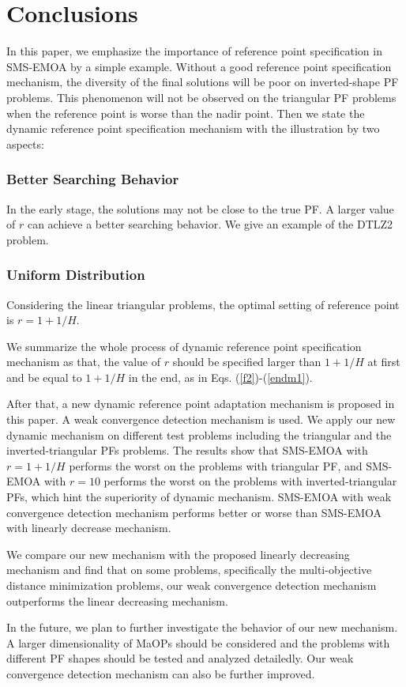 \documentclass[conference]{IEEEtran}
\begin{document}
\section{Conclusions}
In this paper, we emphasize the importance of reference point specification  
in SMS-EMOA by a simple example. 
Without a good reference point specification mechanism, the diversity of the final solutions will be poor
on inverted-shape PF problems. 
This phenomenon will not be observed on the triangular PF problems when the reference point is worse than the nadir point. 
Then we state the dynamic reference point specification mechanism with the illustration by two aspects:
\subsubsection{Better Searching Behavior} In the early stage, 
the solutions may not be close to the true PF. 
A larger value of $r$ can achieve a better searching behavior.
We give an example of the DTLZ2 problem. 
\subsubsection{Uniform Distribution} Considering the linear triangular problems, 
the optimal setting of reference point is $r=1+1/H$. 

We summarize the whole process of dynamic reference point specification mechanism as that,
the value of $r$ should be specified larger than $1+1/H$ at first and be equal to $1+1/H$ in the end,
as in Eqs. (\ref{f2})-(\ref{endm1}).

After that, a new dynamic reference point adaptation mechanism is proposed in this paper.
A weak convergence detection mechanism is used. 
We apply our new dynamic mechanism on different test problems including the triangular and the inverted-triangular PFs problems. 
The results show that SMS-EMOA with $r=1+1/H$ performs the worst on the problems with triangular PF, 
and SMS-EMOA with $r=10$ performs the worst on the problems with inverted-triangular PFs,
which hint the superiority of dynamic mechanism. 
SMS-EMOA with weak convergence detection mechanism performs better or worse than SMS-EMOA with linearly decrease mechanism.

We compare our new mechanism with the proposed linearly decreasing mechanism and find that
on some problems, specifically the multi-objective distance minimization problems,  
our weak convergence detection mechanism outperforms the linear decreasing mechanism. 

In the future, we plan to further investigate the behavior of our new mechanism. 
A larger dimensionality of MaOPs should be considered 
and the problems with different PF shapes should be tested and analyzed detailedly. 
Our weak convergence detection mechanism can also be further improved. 

 
 
\end{document}
